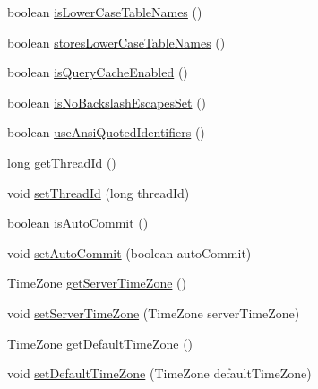 \begin{DoxyCompactItemize}
\item 
boolean \mbox{\hyperlink{classcom_1_1mysql_1_1cj_1_1protocol_1_1a_1_1_native_server_session_a4409c3413cfab0fe0ce91af5d4c05454}{is\+Lower\+Case\+Table\+Names}} ()
\item 
boolean \mbox{\hyperlink{classcom_1_1mysql_1_1cj_1_1protocol_1_1a_1_1_native_server_session_ab4ff668a507b74d55b1a67a47e983660}{stores\+Lower\+Case\+Table\+Names}} ()
\item 
boolean \mbox{\hyperlink{classcom_1_1mysql_1_1cj_1_1protocol_1_1a_1_1_native_server_session_a60bae77bcda04aac21fbbc5a029b8174}{is\+Query\+Cache\+Enabled}} ()
\item 
boolean \mbox{\hyperlink{classcom_1_1mysql_1_1cj_1_1protocol_1_1a_1_1_native_server_session_a649bec25ec5ac1c5084be7be5008844e}{is\+No\+Backslash\+Escapes\+Set}} ()
\item 
boolean \mbox{\hyperlink{classcom_1_1mysql_1_1cj_1_1protocol_1_1a_1_1_native_server_session_a46c8526aa6827ff0fd5a934cf40aab00}{use\+Ansi\+Quoted\+Identifiers}} ()
\item 
long \mbox{\hyperlink{classcom_1_1mysql_1_1cj_1_1protocol_1_1a_1_1_native_server_session_a9de8131697ca7d13a9df02f60568137f}{get\+Thread\+Id}} ()
\item 
void \mbox{\hyperlink{classcom_1_1mysql_1_1cj_1_1protocol_1_1a_1_1_native_server_session_a00f6fda062d4ecc37f9f2561bae423ca}{set\+Thread\+Id}} (long thread\+Id)
\item 
boolean \mbox{\hyperlink{classcom_1_1mysql_1_1cj_1_1protocol_1_1a_1_1_native_server_session_a0c02c1e5f4fb1fd4c03c6ec956e48cff}{is\+Auto\+Commit}} ()
\item 
void \mbox{\hyperlink{classcom_1_1mysql_1_1cj_1_1protocol_1_1a_1_1_native_server_session_ae5619ea0802405494970f91db5b1cc46}{set\+Auto\+Commit}} (boolean auto\+Commit)
\item 
Time\+Zone \mbox{\hyperlink{classcom_1_1mysql_1_1cj_1_1protocol_1_1a_1_1_native_server_session_a2bb2db7f0947a9fc9b287baa6a314314}{get\+Server\+Time\+Zone}} ()
\item 
void \mbox{\hyperlink{classcom_1_1mysql_1_1cj_1_1protocol_1_1a_1_1_native_server_session_a404e7d990dbe62a81e702565dd55c8b5}{set\+Server\+Time\+Zone}} (Time\+Zone server\+Time\+Zone)
\item 
Time\+Zone \mbox{\hyperlink{classcom_1_1mysql_1_1cj_1_1protocol_1_1a_1_1_native_server_session_abba6aad0abd51609f134af9fa2cd345f}{get\+Default\+Time\+Zone}} ()
\item 
void \mbox{\hyperlink{classcom_1_1mysql_1_1cj_1_1protocol_1_1a_1_1_native_server_session_a0136e27d19a065030e8acd8b855a1662}{set\+Default\+Time\+Zone}} (Time\+Zone default\+Time\+Zone)
\end{DoxyCompactItemize}
